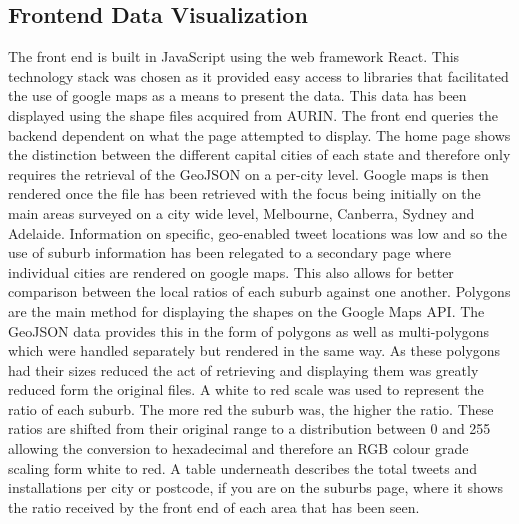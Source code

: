 \documentclass[11pt, oneside]{article}
\begin{document}
\subsection{Frontend Data Visualization}
\label{sec:frontend_data_visualization}
The front end is built in JavaScript using the web framework React. This technology stack was chosen as it provided easy access to libraries that facilitated the use of google maps as a means to present the data. This data has been displayed using the shape files acquired from AURIN. 
\newline
\newline
The front end queries the backend dependent on what the page attempted to display. The home page shows the distinction between the different capital cities of each state and therefore only requires the retrieval of the GeoJSON on a per-city level. Google maps is then rendered once the file has been retrieved with the focus being initially on the main areas surveyed on a city wide level, Melbourne, Canberra, Sydney and Adelaide. 
\newline
\newline
Information on specific, geo-enabled tweet locations was low and so the use of suburb information has been relegated to a secondary page where individual cities are rendered on google maps. This also allows for better comparison between the local ratios of each suburb against one another. 
\newline
\newline
Polygons are the main method for displaying the shapes on the Google Maps API. The GeoJSON data provides this in the form of polygons as well as multi-polygons which were handled separately but rendered in the same way. As these polygons had their sizes reduced the act of retrieving and displaying them was greatly reduced form the original files.
\newline
\newline
A white to red scale was used to represent the ratio of each suburb. The more red the suburb was, the higher the ratio. These ratios are shifted from their original range to a distribution between 0 and 255 allowing the conversion to hexadecimal and therefore an RGB colour grade scaling form white to red.
\newline
\newline
A table underneath describes the total tweets and installations per city or postcode, if you are on the suburbs page, where it shows the ratio received by the front end of each area that has been seen. 
\end{document}
